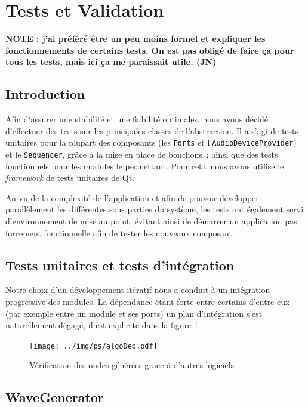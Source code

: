 \section{Tests et Validation}

\textbf{NOTE : j'ai préféré être un peu moins formel et expliquer les fonctionnements de certains tests. On est pas obligé de faire ça pour tous les tests, mais ici ça me paraissait utile. (JN)}

\subsection{Introduction}

Afin d`assurer une stabilité et une fiabilité optimales, nous avons décidé d'effectuer des tests sur les principales classes de l'abstraction. Il a s'agi de tests unitaires pour la plupart des composants (les \verb!Ports! et l'\verb!AudioDeviceProvider!) et le \verb!Sequencer!, grâce à la mise en place de bouchons~; ainsi que des tests fonctionnels pour les modules le permettant.
Pour cela, nous avons utilisé le \emph{framework} de tests unitaires de Qt.

Au vu de la complexité de l'application et afin de pouvoir développer parallèlement les différentes sous parties du système, les tests ont également servi d'environnement de mise au point, évitant ainsi de démarrer un application pas forcement fonctionnelle afin de tester les nouveaux composant.

\subsection{Tests unitaires et tests d'intégration}

Notre choix d'un développement itératif nous a conduit à un intégration progressive des modules. La dépendance étant forte entre certains d'entre eux (par exemple entre un module et ses ports) un plan d'intégration s'est naturellement dégagé, il est explicité dans la figure \ref{integration}
\begin{figure}[htb]
\centering
\texttt{[image: ../img/ps/algoDep.pdf]}
\caption{Vérification des ondes générées grace à d'autres logiciels}
\label{integration}
\end{figure}

\subsection{WaveGenerator}


